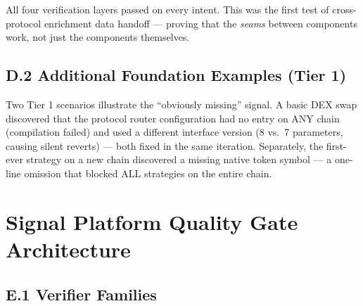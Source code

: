 \documentclass[11pt,a4paper]{article}
\begin{document}
All four verification layers passed on every intent. This was the first test of cross-protocol enrichment data handoff --- proving that the \emph{seams} between components work, not just the components themselves.

\subsection{D.2 Additional Foundation Examples (Tier 1)}\label{sec:d.2-additional-foundation-examples}

Two Tier 1 scenarios illustrate the ``obviously missing'' signal. A basic DEX swap discovered that the protocol router configuration had no entry on ANY chain (compilation failed) and used a different interface version (8 vs.\ 7 parameters, causing silent reverts) --- both fixed in the same iteration. Separately, the first-ever strategy on a new chain discovered a missing native token symbol --- a one-line omission that blocked ALL strategies on the entire chain.

\section{Signal Platform Quality Gate Architecture}\label{sec:appendix-e-signal-platform-quality-gate-architecture}

\subsection{E.1 Verifier Families}\label{sec:e.1-verifier-families}
\end{document}
